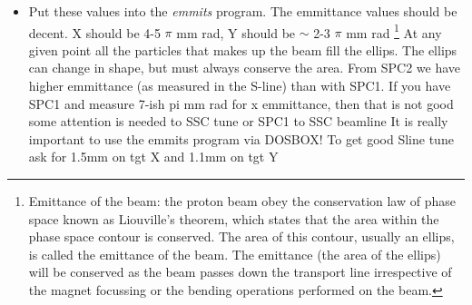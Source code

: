 \documentclass[11pt]{report}
\begin{document}
\begin{itemize}
\item Put these values into the {\it emmits} program. 
	The emmittance values should be decent.
	X should be 4-5 $\pi$ mm rad, Y should be $\sim$ 2-3 $\pi$ mm rad
	 \footnote{Emittance of the beam: the proton beam obey the conservation law of phase space known as Liouville's theorem, 
	which states that the area within the phase space contour is conserved. The area of this contour, usually an ellips, 
	is called the emittance of the beam. The emittance (the area of the ellips) will be conserved as the beam passes down
	 the transport line irrespective of the magnet focussing or the bending operations performed on the beam. }
	At any given point all the particles that makes up the beam fill the ellips. The ellips can change in shape, 
	but must always conserve the area.
	{From SPC2 we have higher emmittance (as measured in the S-line)
	than with SPC1. If you have SPC1 and measure 7-ish pi mm rad for x emmittance, then that is not good 
	some attention is needed to SSC tune or SPC1 to SSC beamline}
        It is really important to use the emmits program via DOSBOX! 
	To get good Sline tune ask for 1.5mm on tgt X and 1.1mm on tgt Y


\end{itemize}
\end{document}
